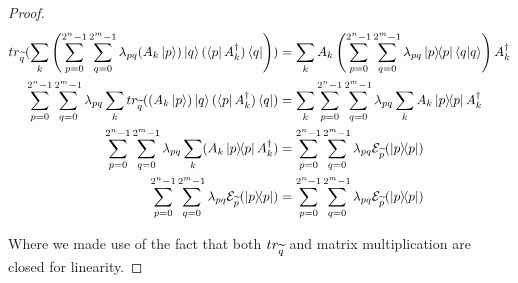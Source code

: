 \begin{proof}
\begin{align*}
\trQ(\sum_k  \left( \sum_{p = 0}^{2^n-1} \sum_{q = 0}^{2^m-1} \lambda_{pq} (A_k\ket{p})\ket{q}(\bra{p}A_k^\dagger) \bra{q} \right) )
&= \sum_k A_k\left( \sum_{p = 0}^{2^n-1} \sum_{q = 0}^{2^m-1} \lambda_{pq} \proj{p}\braket{q | q}\right)A_k^\dagger
\\
\sum_{p = 0}^{2^n-1} \sum_{q = 0}^{2^m-1} \lambda_{pq} \sum_k \trQ( (A_k\ket{p})\ket{q}(\bra{p}A_k^\dagger) \bra{q} ) 
&= \sum_k  \sum_{p = 0}^{2^n-1} \sum_{q = 0}^{2^m-1} \lambda_{pq} \sum_k  A_k \proj{p} A_k^\dagger 
\\
\sum_{p = 0}^{2^n-1} \sum_{q = 0}^{2^m-1} \lambda_{pq} \sum_k (A_k \proj{p} A_k^\dagger) 
&=  \sum_{p = 0}^{2^n-1} \sum_{q = 0}^{2^m-1} \lambda_{pq} \sop_{\widetilde{p}} (\proj{p})
\\
\sum_{p = 0}^{2^n-1} \sum_{q = 0}^{2^m-1} \lambda_{pq} \sop_{\widetilde{p}}(\proj{p})
&=  \sum_{p = 0}^{2^n-1} \sum_{q = 0}^{2^m-1} \lambda_{pq} \sop_{\widetilde{p}} (\proj{p})
\end{align*}

Where we made use of the fact that both $tr_{\widetilde{q}}$ and matrix multiplication are closed for linearity.
\end{proof}

